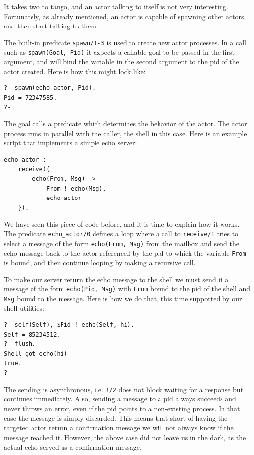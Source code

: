 It takes two to tango, and an actor talking to itself is not very interesting. Fortunately, as already mentioned, an actor is capable of spawning other actors and then start talking to them. 

The built-in predicate \texttt{spawn/1-3} is used to create new actor processes. In a call such as \texttt{spawn(Goal,\,Pid)} it expects a callable goal to be passed in the first argument, and will bind the variable in the second argument to the pid of the actor created. Here is how this might look like:

\begin{verbatim}
?- spawn(echo_actor, Pid).
Pid = 72347585.
?-
\end{verbatim}

\noindent The goal calls a predicate which determines the behavior of the actor. The actor process runs in parallel with the caller, the shell in this case. Here is an example script that implements a simple echo server:

\begin{verbatim}
echo_actor :-          
    receive({            
        echo(From, Msg) ->
            From ! echo(Msg),   
            echo_actor  
    }).        
\end{verbatim}

\noindent We have seen this piece of code before, and it is time to explain how it works. The predicate \texttt{echo\_actor/0} defines a loop where a call to  \texttt{receive/1} tries to select a message of the form \texttt{echo(From,\,Msg)} from the mailbox and send the echo message back to the actor referenced by the pid to which the variable \texttt{From} is bound, and then continue looping by making a recursive call. %

To make our server return the echo message to the shell we must send it a message of the form \texttt{echo(Pid,\,Msg)} with \texttt{From} bound to the pid of the shell and \texttt{Msg} bound to the message. Here is how we do that, this time supported by our shell utilities:

\begin{verbatim}
?- self(Self), $Pid ! echo(Self, hi).
Self = 85234512.
?- flush.
Shell got echo(hi)
true.
?-
\end{verbatim} 

\noindent The sending is asynchronous, i.e. \texttt{!/2} does not block waiting for a response but continues immediately. Also, sending a message to a pid always succeeds and never throws an error, even if the pid points to a non-existing process. 
In that case the message is simply discarded. This means that short of having the targeted actor return a confirmation message we will not always know if the message reached it. However, the above case did not leave us in the dark, as the actual echo served as a confirmation message.

